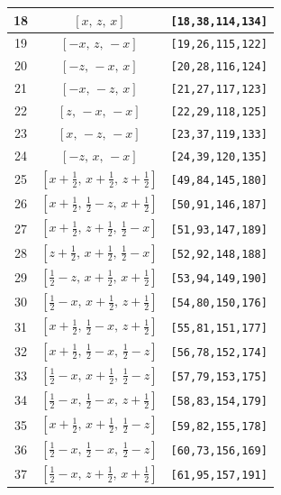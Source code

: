 \documentclass[fleqn,8pt]{jsarticle}
\begin{document}
\begin{longtable}{ccc}
18 & $\left[ x,\, z,\, x \right]$ & {\tt [18,38,114,134]} \\ \hline
19 & $\left[ - x,\, z,\, - x \right]$ & {\tt [19,26,115,122]} \\ \hline
20 & $\left[ - z,\, - x,\, x \right]$ & {\tt [20,28,116,124]} \\ \hline
21 & $\left[ - x,\, - z,\, x \right]$ & {\tt [21,27,117,123]} \\ \hline
22 & $\left[ z,\, - x,\, - x \right]$ & {\tt [22,29,118,125]} \\ \hline
23 & $\left[ x,\, - z,\, - x \right]$ & {\tt [23,37,119,133]} \\ \hline
24 & $\left[ - z,\, x,\, - x \right]$ & {\tt [24,39,120,135]} \\ \hline
25 & $\left[ x + \frac{1}{2},\, x + \frac{1}{2},\, z + \frac{1}{2} \right]$ & {\tt [49,84,145,180]} \\ \hline
26 & $\left[ x + \frac{1}{2},\, \frac{1}{2} - z,\, x + \frac{1}{2} \right]$ & {\tt [50,91,146,187]} \\ \hline
27 & $\left[ x + \frac{1}{2},\, z + \frac{1}{2},\, \frac{1}{2} - x \right]$ & {\tt [51,93,147,189]} \\ \hline
28 & $\left[ z + \frac{1}{2},\, x + \frac{1}{2},\, \frac{1}{2} - x \right]$ & {\tt [52,92,148,188]} \\ \hline
29 & $\left[ \frac{1}{2} - z,\, x + \frac{1}{2},\, x + \frac{1}{2} \right]$ & {\tt [53,94,149,190]} \\ \hline
30 & $\left[ \frac{1}{2} - x,\, x + \frac{1}{2},\, z + \frac{1}{2} \right]$ & {\tt [54,80,150,176]} \\ \hline
31 & $\left[ x + \frac{1}{2},\, \frac{1}{2} - x,\, z + \frac{1}{2} \right]$ & {\tt [55,81,151,177]} \\ \hline
32 & $\left[ x + \frac{1}{2},\, \frac{1}{2} - x,\, \frac{1}{2} - z \right]$ & {\tt [56,78,152,174]} \\ \hline
33 & $\left[ \frac{1}{2} - x,\, x + \frac{1}{2},\, \frac{1}{2} - z \right]$ & {\tt [57,79,153,175]} \\ \hline
34 & $\left[ \frac{1}{2} - x,\, \frac{1}{2} - x,\, z + \frac{1}{2} \right]$ & {\tt [58,83,154,179]} \\ \hline
35 & $\left[ x + \frac{1}{2},\, x + \frac{1}{2},\, \frac{1}{2} - z \right]$ & {\tt [59,82,155,178]} \\ \hline
36 & $\left[ \frac{1}{2} - x,\, \frac{1}{2} - x,\, \frac{1}{2} - z \right]$ & {\tt [60,73,156,169]} \\ \hline
37 & $\left[ \frac{1}{2} - x,\, z + \frac{1}{2},\, x + \frac{1}{2} \right]$ & {\tt [61,95,157,191]} \\ \hline

\end{longtable}
\end{document}
